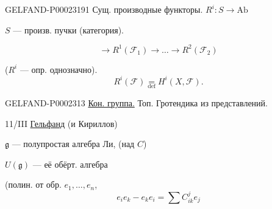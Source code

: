 \begin{GelfandAdjacentEvidence}{GELFAND-P000231}{91}
Сущ. производные функторы. $R^i:S\to\mathrm{Ab}$



$S$ — произв. пучки (категория).



\begin{equation*}
 \to R^1(\mathcal F_1)\to\ldots\to R^2(\mathcal F_2)
\end{equation*}



($R^i$ — опр. однозначно).
\begin{equation*}
 R^i(\mathcal F)\underset{\mathrm{def}}{=}H^i(X,\mathcal F).
\end{equation*}




\end{GelfandAdjacentEvidence}\begin{GelfandAdjacentEvidence}{GELFAND-P000231}{3}
\underline{Кон. группа.} Топ. Гротендика из представлений.







\end{GelfandAdjacentEvidence}



11/III \underline{Гельфанд} (и Кириллов)



$\mathfrak g$ — полупростая алгебра Ли, (над $C$)



$U(\mathfrak g)$ — её обёрт. алгебра



(полин. от обр. $e_1,\ldots,e_n$,
\begin{equation*}
 e_i e_k-e_k e_i=\sum C^j_{ik}e_j
\end{equation*}



